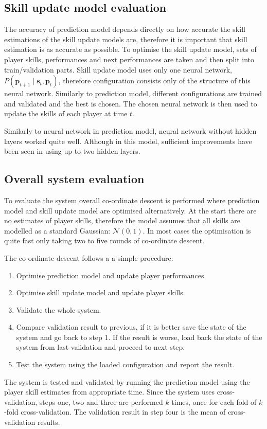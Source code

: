 \documentclass[12pt,a4paper]{book}
\newcommand\bs[1]{\boldsymbol{#1}}
\begin{document}
\subsection{Skill update model evaluation}
The accuracy of prediction model depends directly on how accurate the skill estimations of the skill update models are, therefore it is important that skill estimation is as accurate as possible.
To optimise the skill update model, sets of player skills, performances and next performances are taken and then split into train/validation parts.
Skill update model uses only one neural network, $P(\bs{p}_{t+1}\mid\bs{s}_t,\bs{p}_t)$, therefore configuration consists only of the structure of this neural network.
Similarly to prediction model, different configurations are trained and validated and the best is chosen.
The chosen neural network is then used to update the skills of each player at time $t$.

Similarly to neural network in prediction model, neural network without hidden layers worked quite well.
Although in this model, sufficient improvements have been seen in using up to two hidden layers.

\subsection{Overall system evaluation}
To evaluate the system overall co-ordinate descent is performed where prediction model and skill update model are optimised alternatively.
At the start there are no estimates of player skills, therefore the model assumes that all skills are modelled as a standard Gaussian: $\mathcal{N}(0,1)$.
In most cases the optimisation is quite fast only taking two to five rounds of co-ordinate descent.

The co-ordinate descent follows a a simple procedure:
\begin{enumerate}
\item Optimise prediction model and update player performances.
\item Optimise skill update model and update player skills.
\item Validate the whole system.
\item Compare validation result to previous, if it is better save the state of the system and go back to step 1.
If the result is worse, load back the state of the system from last validation and proceed to next step.
\item Test the system using the loaded configuration and report the result.
\end{enumerate}
The system is tested and validated by running the prediction model using the player skill estimates from appropriate time.
Since the system uses cross-validation, steps one, two and three are performed $k$ times, once for each fold of $k$-fold cross-validation.
The validation result in step four is the mean of cross-validation results.
\end{document}
